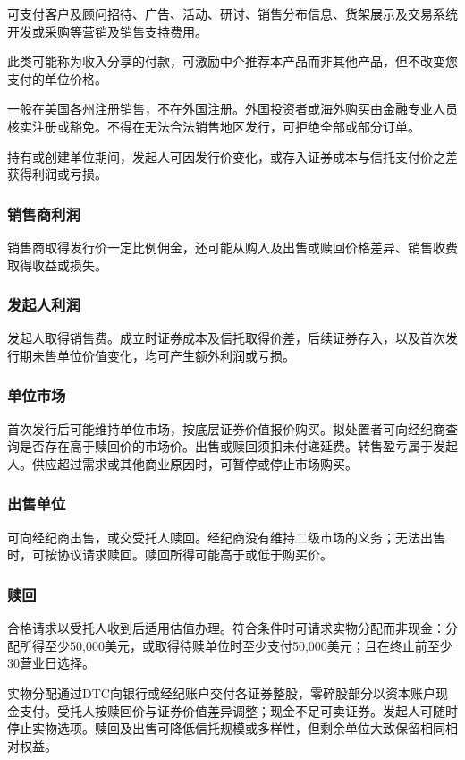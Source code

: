 \documentclass[UTF8,fontset=none,11pt,a4paper]{ctexart}
\begin{document}
可支付客户及顾问招待、广告、活动、研讨、销售分布信息、货架展示及交易系统开发或采购等营销及销售\allowbreak\mbox{支持费用。}


此类可能称为收入分享的付款，可激励中介推荐本产品而非其他产品，但不改变您支付的\allowbreak\mbox{单位价格。}


一般在美国各州注册销售，不在外国注册。外国投资者或海外购买由金融专业人员核实注册或豁免。不得在无法合法销售地区发行，可拒绝全部或\allowbreak\mbox{部分订单。}


持有或创建单位期间，发起人可因发行价变化，或存入证券成本与信托支付价之差获得利\allowbreak\mbox{润或亏损。}


\subsubsection*{销售商利润}
销售商取得发行价一定比例佣金，还可能从购入及出售或赎回价格差异、销售收费取得收\allowbreak\mbox{益或损失。}


\subsubsection*{发起人利润}
发起人取得销售费。成立时证券成本及信托取得价差，后续证券存入，以及首次发行期未售单位价值变化，均可产生额外利\allowbreak\mbox{润或亏损。}


\subsubsection*{单位市场}
首次发行后可能维持单位市场，按底层证券价值报价购买。拟处置者可向经纪商查询是否存在高于赎回价的市场价。出售或赎回须扣未付递延费。转售盈亏属于发起人。供应超过需求或其他商业原因时，可暂停或停止\allowbreak\mbox{市场购买。}


\subsubsection*{出售单位}
可向经纪商出售，或交受托人赎回。经纪商没有维持二级市场的义务；无法出售时，可按协议请求赎回。赎回所得可能高于或低\allowbreak\mbox{于购买价。}


\subsubsection*{赎回}
合格请求以受托人收到后适用估值办理。符合条件时可请求实物分配而非现金：分配所得至少50,000美元，或取得待赎单位时至少支付50,000美元；且在终止前至少30营\allowbreak\mbox{业日选择。}


实物分配通过DTC向银行或经纪账户交付各证券整股，零碎股部分以资本账户现金支付。受托人按赎回价与证券价值差异调整；现金不足可卖证券。发起人可随时停止实物选项。赎回及出售可降低信托规模或多样性，但剩余单位大致保留相同\allowbreak\mbox{相对权益。}
\end{document}
